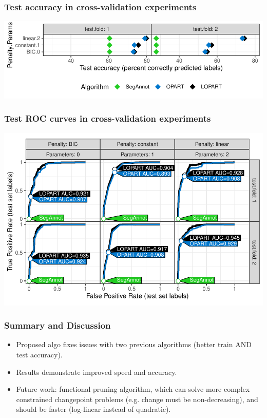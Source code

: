 \documentclass{beamer}
\begin{document}
\begin{frame}
  \frametitle{Test accuracy in cross-validation experiments}
  \includegraphics[width=\textwidth]{figure-cv-BIC}
  
\end{frame}

\begin{frame}
  \frametitle{Test ROC curves in cross-validation experiments}
  \includegraphics[width=\textwidth]{figure-cv-BIC-roc}
  
\end{frame}

\begin{frame}
  \frametitle{Summary and Discussion}
  \begin{itemize}
  \item Proposed algo fixes issues with two previous algorithms (better
  train AND test accuracy).
\item Results demonstrate improved speed and accuracy.
\item Future work: functional pruning algorithm, which can solve more
  complex constrained changepoint problems (e.g. change must be
  non-decreasing), and should be faster (log-linear instead of
  quadratic).
  \end{itemize}
\end{frame}
\end{document}
